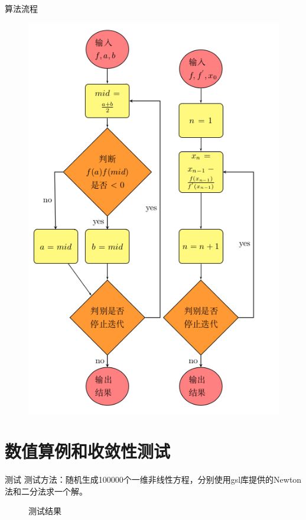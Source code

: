 \documentclass{beamer}
\begin{document}
\begin{frame}{算法流程}
    \begin{figure}[H]
        \centering
        \includegraphics[scale=0.28]{./pic/3.png}
         \label{algo::1}
        \end{figure}
\end{frame}
\section{数值算例和收敛性测试}
\begin{frame}{测试}
    测试方法：随机生成100000个一维非线性方程，分别使用gsl库提供的Newton法和二分法求一个解\cite{GSL_roots}。

    \begin{figure}[H]
        \begin{center}
             
        \end{center}
        \label{fig::1}
        \caption{测试结果}
   \end{figure}
\end{frame}
\end{document}
